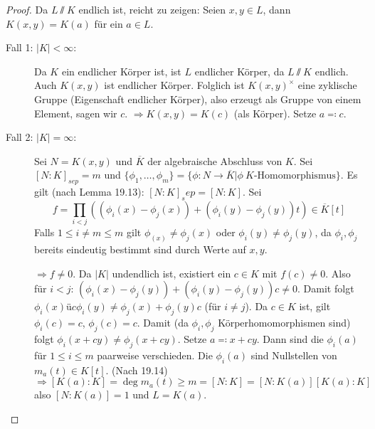 \documentclass[12pt,a4paper]{scrartcl}
\begin{document}
\begin{proof}
	Da $L\sslash K$ endlich ist, reicht zu zeigen: Seien $x,y\in L$, dann $K(x,y) =K (a)$ für ein $a\in L$.
	\begin{description}
		\item[Fall 1: $|K|<\infty$:] Da $K$ ein endlicher Körper ist, ist $L$ endlicher Körper, da $L\sslash K$ endlich. Auch $K(x,y)$ ist endlicher Körper. Folglich ist $K(x,y)^{\times}$ eine zyklische Gruppe (Eigenschaft endlicher Körper), also erzeugt als Gruppe von einem Element, sagen wir $c$. $\Rightarrow K(x,y) =K(c)$ (als Körper). Setze $a\eqqcolon c$.
		\item[Fall 2: $|K|  =\infty$:] Sei $N = K(x,y)$ und $\overline{K}$ der algebraische Abschluss von $K$. Sei $[N:K]_{sep} = m$ und $\{\phi_1,\dots,\phi_m\} = \{\phi\colon N\to \overline{K}|\phi\ K\text{-Homomorphismus}\}$. Es gilt (nach Lemma 19.13): $[N:K]_sep = [N:K]$. Sei %
		$$ f = \prod_{i<j}( (\phi_i(x)-\phi_j(x))+(\phi_i(y)-\phi_j(y))t)\in\overline{K}[t]$$
		Falls $1\leq i\neq m\leq m$ gilt $\phi_(x) \neq \phi_j(x)$ oder $\phi_i(y)\neq\phi_j(y)$, da $\phi_i,\phi_j$ bereits eindeutig bestimmt sind durch Werte auf $x,y$.
		
		$\Rightarrow f\neq 0$. Da $|K|$ undendlich ist, existiert ein $c\in K$ mit $f(c) \neq 0$. Also für $i<j$: $(\phi_i(x)-\phi_j(y))+(\phi_i(y)-\phi_j(y))c \neq 0$. Damit folgt $\phi_i(x) üc\phi_i(y)\neq \phi_j(x)+\phi_j(y)c$ (für $i\neq j$). Da $c\in K$ ist, gilt $\phi_i(c) = c$, $\phi_j(c) = c$. Damit (da $\phi_i,\phi_j$ Körperhomomorphismen sind) folgt $\phi_i(x+cy)\neq \phi_j(x+cy)$. Setze $a\eqqcolon x +cy$. Dann sind die $\phi_i(a)$ für $1\leq i\leq m$ paarweise verschieden. Die $\phi_i(a)$ sind Nullstellen von $m_a(t)\in K[t]$. (Nach 19.14)
		$$\Rightarrow [K(a):K] = \deg m_a(t)\geq m = [N:K] = [N:K(a)][K(a):K]$$
		also $[N:K(a)] = 1$ und $L = K(a)$.
	\end{description}
	
	
\end{proof}
\end{document}
